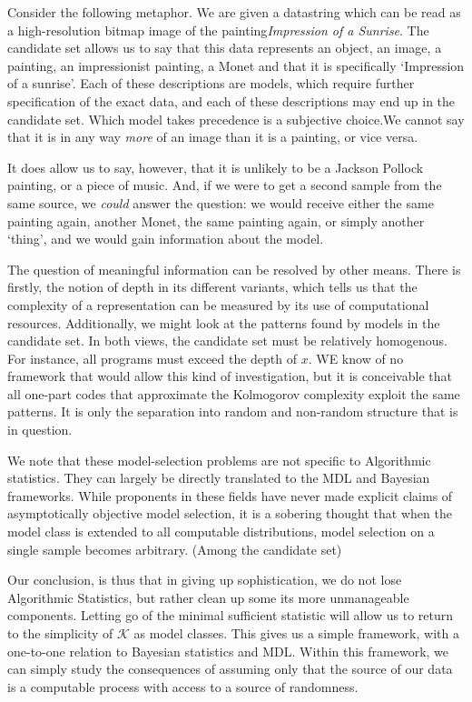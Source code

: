 \documentclass{style/llncs}
\newcommand{\K}{\mathscr K}
\begin{document}
Consider the following metaphor. We are given a datastring which can be read as a high-resolution bitmap image of the painting\emph{Impression of a Sunrise}. The candidate set allows us to say that this data represents an object, an image, a painting, an impressionist painting, a Monet and that it is specifically `Impression of a sunrise'. Each of these descriptions are models, which require further specification of the exact data, and each of these descriptions may end up in the candidate set. Which model takes precedence is a subjective choice.We cannot  say that it is in any way \emph{more} of an image than it is a painting, or vice versa.

It does allow us to say, however, that it is unlikely to be a Jackson Pollock painting, or a piece of music. And, if we were to get a second sample from the same source, we \emph{could} answer the question: we would receive either the same painting again, another Monet, the same painting again, or simply another `thing', and we would gain information about the model.

The question of meaningful information can be resolved by other means. There is firstly, the notion of depth in its different variants, which tells us that the complexity of a representation can be measured by its use of computational resources. Additionally, we might look at the patterns found  by models in the candidate set. In both views, the candidate set must be relatively homogenous. For instance, all programs must exceed the depth of $x$. WE know of no framework that would allow this kind of investigation, but it is conceivable that all one-part codes that approximate the Kolmogorov complexity exploit the same patterns. It is only the separation into random and non-random structure that is in question.

We note that these model-selection problems are not specific to Algorithmic statistics. They can largely be directly translated to the MDL and Bayesian frameworks. While proponents in these fields have never made explicit claims of asymptotically objective model selection, it is a sobering thought that when the model class is extended to all computable distributions, model selection on a single sample becomes arbitrary. (Among the candidate set)

Our conclusion, is thus that in giving up sophistication, we do not lose Algorithmic Statistics, but rather clean up some its more unmanageable components. Letting go of the minimal sufficient statistic will allow us to return to the simplicity of $\K$ as model classes. This gives us a simple framework, with a one-to-one relation to Bayesian statistics and MDL. Within this framework, we can simply study the consequences of assuming only that the source of our data is a computable process with access to a source of randomness.
\end{document}
